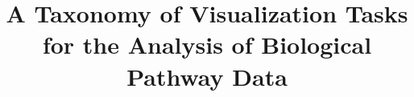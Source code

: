 \documentclass[twocolumn]{bmcart}%
\begin{document}
\begin{frontmatter}

\begin{fmbox}


\title{A Taxonomy of Visualization Tasks for the Analysis of Biological Pathway Data}

\author[
     addressref={aff1},
   email={anonymous@gmail.com}
]{ }
\author[
   addressref={aff1},                   %
  email={alsoanonymous@gmail.com}   %
]{ }
\author[
     addressref={aff3},
   email={anonymous@gmail.com}
]{ }


\address[id=aff1]{%
  , %
}
\address[id=aff2]{%
  , %
}
\address[id=aff3]{%
  , %
}



\end{fmbox}
\end{frontmatter}
\end{document}

